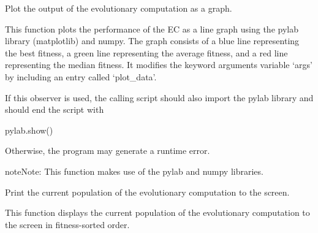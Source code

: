 \documentclass[letterpaper,10pt,english]{sphinxmanual}
\begin{document}

\begin{fulllineitems}
\label{reference:inspyred.ec.observers.plot_observer}
Plot the output of the evolutionary computation as a graph.

This function plots the performance of the EC as a line graph 
using the pylab library (matplotlib) and numpy. The graph consists of a 
blue line representing the best fitness, a green line representing
the average fitness, and a red line representing the median fitness.
It modifies the keyword arguments variable `args' by including an
entry called `plot\_data'.

If this observer is used, the calling script should also import
the pylab library and should end the script with

pylab.show()

Otherwise, the program may generate a runtime error.

\begin{notice}{note}{Note:}
This function makes use of the pylab and numpy libraries.
\end{notice}

\end{fulllineitems}


\begin{fulllineitems}
\label{reference:inspyred.ec.observers.population_observer}
Print the current population of the evolutionary computation to the screen.

This function displays the current population of the evolutionary 
computation to the screen in fitness-sorted order.

\end{fulllineitems}

\end{document}

